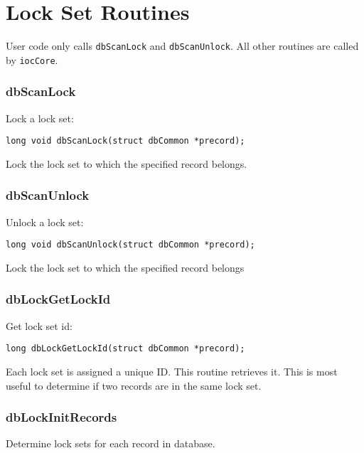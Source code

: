 \section{Lock Set Routines}

User code only calls \verb|dbScanLock| and \verb|dbScanUnlock|. All other routines are called by \verb|iocCore|.

\subsubsection{dbScanLock}

Lock a lock set:

\begin{verbatim}
long void dbScanLock(struct dbCommon *precord);
\end{verbatim}

Lock the lock set to which the specified record belongs.

\subsubsection{dbScanUnlock}

Unlock a lock set:

\begin{verbatim}
long void dbScanUnlock(struct dbCommon *precord);
\end{verbatim}

Lock the lock set to which the specified record belongs

\subsubsection{dbLockGetLockId}

Get lock set id:

\begin{verbatim}
long dbLockGetLockId(struct dbCommon *precord);
\end{verbatim}

Each lock set is assigned a unique ID. This routine retrieves it. This is most useful to determine if two records are in the 
same lock set.

\subsubsection{dbLockInitRecords}

Determine lock sets for each record in database.


